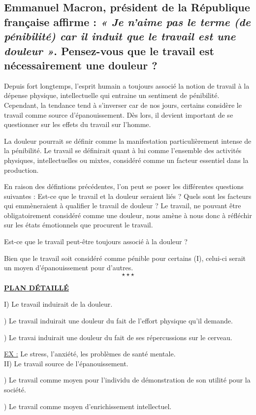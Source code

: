 \newpage \begin{center}
	\subsection*{Emmanuel Macron, président de la République française affirme : \textit{« Je n’aime pas le terme (de pénibilité) car il induit que le travail est une douleur »}. Pensez-vous que le travail est nécessairement une douleur ? }
\end{center}

Depuis fort longtemps, l'esprit humain a toujours associé la notion de travail à la dépense physique, intellectuelle qui entraine un sentiment de pénibilité. Cependant, la tendance tend à s'inverser car de nos jours, certains considère le travail comme source d'épanouissement. Dès lors, il devient important de se questionner sur les effets du travail sur l'homme.

La douleur pourrait se définir comme la manifestation particulièrement intense de la pénibilité. Le travail se définirait quant à lui comme l'ensemble des activités physiques, intellectuelles ou mixtes, considéré comme un facteur essentiel dans la production.

En raison des défintions précédentes, l'on peut se poser les différentes questions suivantes : Est-ce que le travail et la douleur seraient liés ? Quels sont les facteurs qui emmèneraient à qualifier le travail de douleur ? Le travail, ne pouvant être obligatoirement considéré comme une douleur, nous amène à nous donc à réfléchir sur les états émotionnels que procurent le travail.

Est-ce que le travail peut-être toujours associé à la douleur ?

Bien que le travail soit considéré comme pénible pour certains (I), celui-ci serait un moyen d'épanouissement pour d'autres.
$$\star \star \star$$

\begin{center}
	\textbf{\underline{PLAN D\'ETAILL\'E}}
\end{center}
\noindent I) Le travail induirait de la douleur.

) Le travail induirait une douleur du fait de l'effort physique qu'il demande.

) Le travai induirait une douleur du fait de ses répercussions sur le cerveau.

\indent \indent \underline{EX :} Le stress, l'anxiété, les problèmes de santé mentale.\\

\noindent II) Le travail source de l'épanouissement.

) Le travail comme moyen pour l'individu de démonstration de son utilité pour la société.

) Le travail comme moyen d'enrichissement intellectuel.

